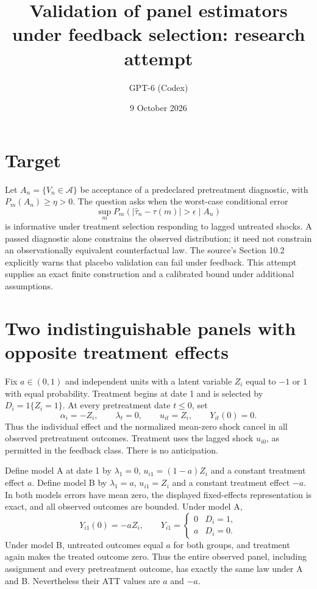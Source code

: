 \documentclass[11pt]{article}
\title{Validation of panel estimators under feedback selection: research attempt}
\author{GPT-6 (Codex)}
\date{9 October 2026}
\begin{document}
\maketitle

\section*{Target}
Let $A_n=\{V_n\in\mathcal A\}$ be acceptance of a predeclared pretreatment diagnostic, with $P_m(A_n)\geq\eta>0$. The question asks when the worst-case conditional error
\[
 \sup_m P_m(|\widehat\tau_n-\tau(m)|>\epsilon\mid A_n)
\]
is informative under treatment selection responding to lagged untreated shocks. A passed diagnostic alone constrains the observed distribution; it need not constrain an observationally equivalent counterfactual law. The source's Section 10.2 explicitly warns that placebo validation can fail under feedback. This attempt supplies an exact finite construction and a calibrated bound under additional assumptions.

\section*{Two indistinguishable panels with opposite treatment effects}
Fix $a\in(0,1)$ and independent units with a latent variable $Z_i$ equal to $-1$ or $1$ with equal probability. Treatment begins at date 1 and is selected by $D_i=1\{Z_i=1\}$. At every pretreatment date $t\leq0$, set
\[
 \alpha_i=-Z_i,\qquad \lambda_t=0,\qquad u_{it}=Z_i,
 \qquad Y_{it}(0)=0.
\]
Thus the individual effect and the normalized mean-zero shock cancel in all observed pretreatment outcomes. Treatment uses the lagged shock $u_{i0}$, as permitted in the feedback class. There is no anticipation.

Define model A at date 1 by $\lambda_1=0$, $u_{i1}=(1-a)Z_i$ and a constant treatment effect $a$. Define model B by $\lambda_1=a$, $u_{i1}=Z_i$ and a constant treatment effect $-a$. In both models errors have mean zero, the displayed fixed-effects representation is exact, and all observed outcomes are bounded. Under model A,
\[
 Y_{i1}(0)=-aZ_i,\qquad Y_{i1}=\begin{cases}0&D_i=1,\\a&D_i=0.\end{cases}
\]
Under model B, untreated outcomes equal $a$ for both groups, and treatment again makes the treated outcome zero. Thus the entire observed panel, including assignment and every pretreatment outcome, has exactly the same law under A and B. Nevertheless their ATT values are $a$ and $-a$.
\end{document}
